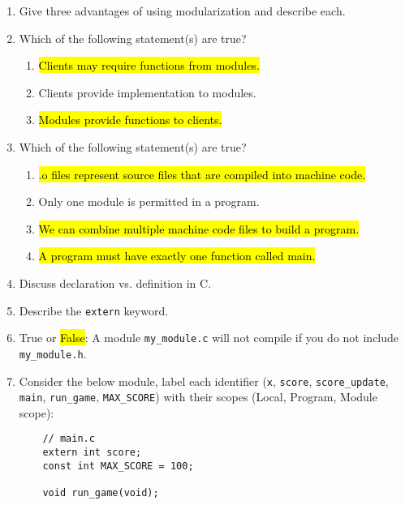 \documentclass{article}
\begin{document}
\begin{enumerate}
    \item Give three advantages of using modularization and describe each.
    \vspace{16mm}
    \item Which of the following statement(s) are true?
    \begin{enumerate}[label=\alph*.]
        \item \hl{Clients may require functions from modules.} 
        \item Clients provide implementation to modules.
        \item \hl{Modules provide functions to clients.}
    \end{enumerate}
    \item Which of the following statement(s) are true?
    \begin{enumerate}[label=\alph*.]
        \item \hl{.o files represent source files that are compiled into machine code.}
        \item Only one module is permitted in a program.
        \item \hl{We can combine multiple machine code files to build a program.}
        \item \hl{A program must have exactly one function called main.}
    \end{enumerate}
    \item Discuss declaration vs. definition in C.
    \vspace{16mm}
    \item Describe the \texttt{extern} keyword.
    \vspace{16mm}
    \item True or \hl{False}: A module \texttt{my\_module.c} will not compile if you do not include \texttt{my\_module.h}.
    
 
\item Consider the below module, label each identifier (\texttt{x}, \texttt{score}, \texttt{score\_update}, \texttt{main}, \texttt{run\_game}, \texttt{MAX\_SCORE}) with their scopes (Local, Program, Module scope):

    
    \noindent
    
    
    \begin{minipage}{.5\textwidth}
    \begin{lstlisting}
    // main.c
    extern int score;
    const int MAX_SCORE = 100;
    
    void run_game(void);
    

\end{lstlisting}
\end{minipage}
\end{enumerate}
\end{document}
